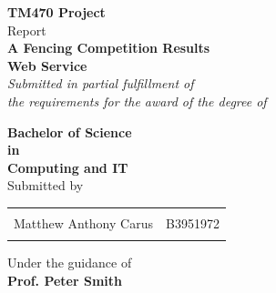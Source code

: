 \begin{titlepage}

\begin{center}

\textup{\small {\bf TM470 Project} \\ Report}\\[0.2in]

\Large \textbf {A Fencing Competition Results \\ Web Service}\\[0.5in]

       \small \emph{Submitted in partial fulfillment of\\
        the requirements for the award of the degree of}
        \vspace{.2in}

       {\bf Bachelor of Science \\in\\ Computing and IT}\\[0.3in]

\normalsize Submitted by \\
\begin{table}[h]
\centering
\begin{tabular}{lr}\hline 
\\
Matthew Anthony Carus & B3951972 \\ \\ \hline 
\end{tabular}
\end{table}

\vspace{.1in}
Under the guidance of\\
{\textbf{Prof. Peter Smith}}\\[0.2in]

\vfill




\end{center}
\end{titlepage}
